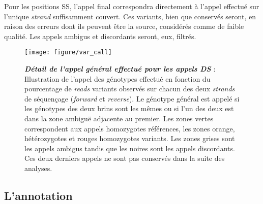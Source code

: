 \documentclass[12pt,a4paper,twoside]{ugathesis}
\begin{document}
Pour les positions SS, l'appel final correspondra directement à l'appel
effectué sur l'unique \emph{strand} suffisamment couvert. Ces variants,
bien que conservés seront, en raison des erreurs dont ils peuvent être
la source, considérés comme de faible qualité. Les appels ambigus et
discordants seront, eux, filtrés.

\newpage

\begin{figure}

{\centering \texttt{[image: figure/var\_call]} 

}

\caption[Détail de l'appel général effectué pour les appels DS]{\textbf{\emph{Détail de l'appel général effectué pour
les appels DS}} : Illustration de l'appel des génotypes effectué en
fonction du pourcentage de \emph{reads} variants observés sur chacun des
deux \emph{strands} de séquençage (\emph{forward} et \emph{reverse}). Le
génotype général est appelé si les génotypes des deux brins sont les
mêmes ou si l'un des deux est dans la zone ambiguë adjacente au premier.
Les zones vertes correspondent aux appels homozygotes références, les
zones orange, hétérozygotes et rouges homozygotes variants. Les zones
grises sont les appels ambigus tandis que les noires sont les appels
discordants. Ces deux derniers appels ne sont pas conservés dans la
suite des analyses.}\label{fig:picvarcall}
\end{figure}













\newpage

\subsection{L'annotation}\label{lannotation}
\end{document}
